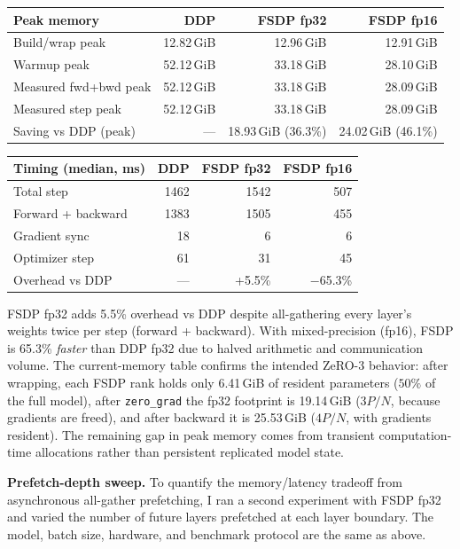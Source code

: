 \documentclass[11pt]{article}
\begin{document}
\begin{center}
\begin{tabular}{l rrr}
\toprule
Peak memory & DDP & FSDP fp32 & FSDP fp16 \\
\midrule
Build/wrap peak        & 12.82\,GiB & 12.96\,GiB & 12.91\,GiB \\
Warmup peak            & 52.12\,GiB & 33.18\,GiB & 28.10\,GiB \\
Measured fwd+bwd peak  & 52.12\,GiB & 33.18\,GiB & 28.09\,GiB \\
Measured step peak     & 52.12\,GiB & 33.18\,GiB & 28.09\,GiB \\
\midrule
Saving vs DDP (peak)   & --- & 18.93\,GiB (36.3\%) & 24.02\,GiB (46.1\%) \\
\bottomrule
\end{tabular}
\end{center}

\begin{center}
\begin{tabular}{l rrr}
\toprule
Timing (median, ms) & DDP & FSDP fp32 & FSDP fp16 \\
\midrule
Total step         & 1462 & 1542 & 507 \\
Forward + backward & 1383 & 1505 & 455 \\
Gradient sync      &   18 &    6 &   6 \\
Optimizer step     &   61 &   31 &  45 \\
\midrule
Overhead vs DDP    & ---  & +5.5\% & $-$65.3\% \\
\bottomrule
\end{tabular}
\end{center}

FSDP fp32 adds 5.5\% overhead vs DDP despite all-gathering every
layer's weights twice per step (forward + backward).
With mixed-precision (fp16), FSDP is 65.3\% \emph{faster} than DDP fp32
due to halved arithmetic and communication volume.
The current-memory table confirms the intended ZeRO-3 behavior: after
wrapping, each FSDP rank holds only 6.41\,GiB of resident parameters
($50\%$ of the full model), after \texttt{zero\_grad} the fp32 footprint is
19.14\,GiB ($3P/N$, because gradients are freed), and after backward it is
25.53\,GiB ($4P/N$, with gradients resident).  The remaining gap in peak
memory comes from transient computation-time allocations rather than persistent
replicated model state.

\textbf{Prefetch-depth sweep.}
To quantify the memory/latency tradeoff from asynchronous all-gather
prefetching, I ran a second experiment with FSDP fp32 and varied the number
of future layers prefetched at each layer boundary.  The model, batch size,
hardware, and benchmark protocol are the same as above.
\end{document}
